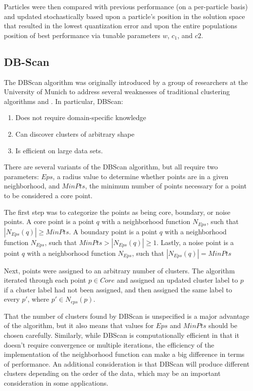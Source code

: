\documentclass[conference]{IEEEtran}
\begin{document}
  Particles were then compared with previous performance (on a per-particle basis) and updated stochastically based upon a particle's position in the solution space that resulted in the lowest quantization error and upon the entire populations position of best performance via tunable parameters $w$, $c_1$, and $c2$.

  \subsection{DB-Scan}
  The DBScan algorithm was originally introduced by a group of researchers at the University of Munich to address several weaknesses of traditional clustering algorithms \cite{ankerst} and \cite{ester}.  In particular, DBScan:

  \begin{enumerate}
  \item Does not require domain-specific knowledge
  \item Can discover clusters of arbitrary shape
  \item Is efficient on large data sets.
  \end{enumerate}

  There are several variants of the DBScan algorithm, but all require two parameters: $Eps$, a radius value to determine whether points are in a given neighborhood, and $MinPts$, the minimum number of points necessary for a point to be considered a core point.

  The first step was to categorize the points as being core, boundary, or noise points.  A core point is a point $q$ with a neighborhood function $N_{Eps}$, such that $|N_{Eps}(q)|\geq MinPts$. A boundary point is a point $q$ with a neighborhood function $N_{Eps}$, such that $MinPts>|N_{Eps}(q)|\geq 1$. Lastly, a noise point is a point $q$ with a neighborhood function $N_{Eps}$, such that $|N_{Eps}(q)|= MinPts$

  Next, points were assigned to an arbitrary number of clusters.  The algorithm iterated through each point $p \in Core$ and assigned an updated cluster label to $p$ if a cluster label had not been assigned, and then assigned the same label to every $p'$, where $p' \in N_{eps}(p)$.

  That the number of clusters found by DBScan is unspecified is a major advantage of the algorithm, but it also means that values for $Eps$ and $MinPts$ should be chosen carefully.  Similarly, while DBScan is computationally efficient in that it doesn't require convergence or multiple iterations, the efficiency of the implementation of the neighborhood function can make a big difference in terms of performance. An additional consideration is that DBScan will produce different clusters depending on the order of the data, which may be an important consideration in some applications.
\end{document}

